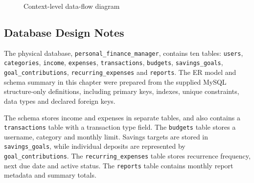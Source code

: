 \documentclass{tietreport}
\begin{document}
\begin{figure}[htbp]
\centering
\begin{center}
\end{center}
\caption{Context-level data-flow diagram}
\label{fig:dfd}
\end{figure}

\subsection{Database Design Notes}

The physical database, \texttt{personal\_finance\_manager}, contains ten
tables: \texttt{users}, \texttt{categories}, \texttt{income},
\texttt{expenses}, \texttt{transactions}, \texttt{budgets},
\texttt{savings\_goals}, \texttt{goal\_contributions},
\texttt{recurring\_expenses} and \texttt{reports}. The ER model and
schema summary in this chapter were prepared from the supplied MySQL
structure-only definitions, including primary keys, indexes, unique
constraints, data types and declared foreign keys.

The schema stores income and expenses in separate tables, and also
contains a \texttt{transactions} table with a transaction type field.
The \texttt{budgets} table stores a username, category and monthly
limit. Savings targets are stored in \texttt{savings\_goals}, while
individual deposits are represented by \texttt{goal\_contributions}.
The \texttt{recurring\_expenses} table stores recurrence frequency,
next due date and active status. The \texttt{reports} table contains
monthly report metadata and summary totals.
\end{document}
